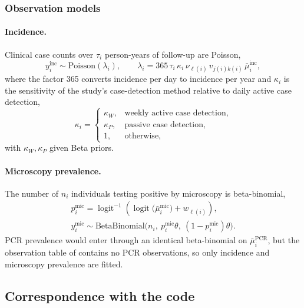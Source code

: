 \subsubsection{Observation models}

\paragraph{Incidence.} Clinical case counts over $\tau_i$ person-years of follow-up are Poisson,
\begin{equation*}
y^{\mathrm{inc}}_i \sim \mathrm{Poisson}(\lambda_i),
\qquad
\lambda_i = 365\,\tau_i\,\kappa_i\,\nu_{\ell(i)}\,v_{j(i)k(i)}\,\bar\mu^{\mathrm{inc}}_i,
\end{equation*}
where the factor 365 converts incidence per day to incidence per year and $\kappa_i$ is the sensitivity of the study's case-detection method relative to daily active case detection,
\begin{equation*}
\kappa_i = \begin{cases}
\kappa_W, & \text{weekly active case detection}, \\
\kappa_P, & \text{passive case detection}, \\
1, & \text{otherwise},
\end{cases}
\end{equation*}
with $\kappa_W, \kappa_P$ given Beta priors.

\paragraph{Microscopy prevalence.} The number of $n_i$ individuals testing positive by microscopy is beta-binomial,
\begin{gather*}
p^{\mathrm{mic}}_i = \operatorname{logit}^{-1}\!\left(\operatorname{logit}\big(\bar\mu^{\mathrm{mic}}_i\big) + w_{\ell(i)}\right), \\
y^{\mathrm{mic}}_i \sim \mathrm{BetaBinomial}\big(n_i,\ p^{\mathrm{mic}}_i\theta,\ (1 - p^{\mathrm{mic}}_i)\theta\big).
\end{gather*}
PCR prevalence would enter through an identical beta-binomial on $\bar\mu^{\mathrm{PCR}}_i$, but the observation table of \citet{griffin_estimates_2014} contains no PCR observations, so only incidence and microscopy prevalence are fitted.

\subsection{Correspondence with the code}

